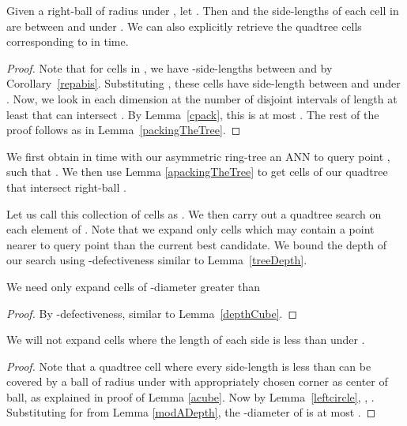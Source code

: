 \documentclass[11pt]{myclass}
\begin{document}
 \begin{lemma}\label{apackingTheTree}
 Given a  right-ball  of radius  under , let . 
Then  and the side-lengths of each cell in  are
between  and  under . We can also explicitly retrieve 
the quadtree cells corresponding to  in  time.
 \end{lemma}

 \begin{proof}
 Note that for cells in , we have -side-lengths between 
 and  by Corollary~\ref{repabis}.
  Substituting ,  these cells have side-length 
between  and  under .
 Now, we look in each dimension at the number of disjoint intervals of length 
at least  that can intersect . By Lemma~\ref{cpack}, this is at most .
 The rest of the proof follows as in Lemma~\ref{packingTheTree}. 
 \end{proof}

 We first obtain in  time with our asymmetric ring-tree an  
ANN  to query point , such that
.
 We then use Lemma \ref{apackingTheTree} to get  cells of our quadtree that 
intersect right-ball . 

Let us call this collection of cells as . We then carry out a quadtree search on each element
of . Note that we expand only cells which may contain a point nearer to query point 
than the current best candidate. We bound the depth of our search using -defectiveness
similar to Lemma~\ref{treeDepth}.


\begin{lemma}\label{modADepth}
 We need only expand cells of -diameter greater than 

\end{lemma}

\begin{proof}
 By -defectiveness, similar to Lemma~\ref{depthCube}.
\end{proof}

\begin{corollary}\label{asidelen}
 We will not expand cells where the length of each side is less than 
 under .
\end{corollary}

 \begin{proof}
Note that a quadtree cell  where every side-length is less than  can be covered by a ball of radius  under 
  with appropriately chosen corner as center of ball, 
as explained in proof of Lemma \ref{acube}. Now by Lemma~\ref{leftcircle}, 
, . 
Substituting for  from Lemma \ref{modADepth}, the -diameter of  is at 
most .
 \end{proof}
\end{document}
